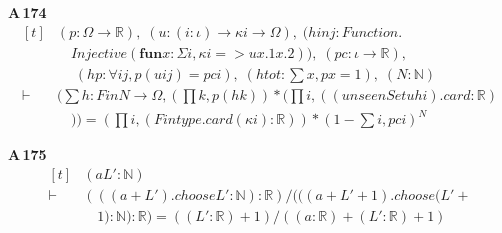 \noindent\textbf{A\,174}\quad{}
{\footnotesize\[ \begin{aligned}[t]
&(\mathit{p} : \Omega \to \mathbb{R} ),\; (\mathit{u} : (\mathit{i} : \iota ) \to \kappa \mathit{i} \to \Omega ),\; (\mathit{hinj} : \mathit{Function}.\\
&\quad \mathit{Injective} (\mathbf{fun} \mathit{x} : \Sigma \mathit{i}, \kappa \mathit{i} => \mathit{u} \mathit{x}.1 \mathit{x}.2)),\; (\mathit{pc} : \iota \to \mathbb{R} ),\\
&\quad \; (\mathit{hp} : \forall \mathit{i} \mathit{j}, \mathit{p} (\mathit{u} \mathit{i} \mathit{j}) = \mathit{pc} \mathit{i}),\; (\mathit{htot} : \textstyle\sum \mathit{x}, \mathit{p} \mathit{x} = 1),\; (\mathit{N} : \mathbb{N} )\\
\vdash\;&(\textstyle\sum \mathit{h} : \mathit{Fin} \mathit{N} \to \Omega , (\textstyle\prod \mathit{k}, \mathit{p} (\mathit{h} \mathit{k})) * (\textstyle\prod \mathit{i}, ((\mathit{unseenSet} \mathit{u} \mathit{h} \mathit{i}).\mathit{card} : \mathbb{R} )\\
&\quad )) = (\textstyle\prod \mathit{i}, (\mathit{Fintype}.\mathit{card} (\kappa \mathit{i}) : \mathbb{R} )) * (1 - \textstyle\sum \mathit{i}, \mathit{pc} \mathit{i}) ^{\mathit{N}}
\end{aligned} \]}

\noindent\textbf{A\,175}\quad{}
{\footnotesize\[ \begin{aligned}[t]
&(\mathit{a} \mathit{L'} : \mathbb{N} )\\
\vdash\;&(((\mathit{a} + \mathit{L'}).\mathit{choose} \mathit{L'} : \mathbb{N} ) : \mathbb{R} ) / (((\mathit{a} + \mathit{L'} + 1).\mathit{choose} (\mathit{L'} +\\
&\quad 1) : \mathbb{N} ) : \mathbb{R} ) = ((\mathit{L'} : \mathbb{R} ) + 1) / ((\mathit{a} : \mathbb{R} ) + (\mathit{L'} : \mathbb{R} ) + 1)
\end{aligned} \]}

